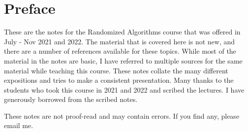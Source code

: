 \chapter*{Preface}

These are the notes for the Randomized Algorithms course that was offered in
July - Nov 2021 and 2022. The material that is covered here is not new, and
there are a number of references available for these topics. While most of the
material in the notes are basic, I have referred to multiple sources for the
same material while teaching this course. These notes collate the many different
expositions and tries to make a consistent presentation. Many thanks to the
students who took this course in 2021 and 2022 and scribed the
lectures. I have generously borrowed from the scribed notes.

These notes are not proof-read and may contain errors. If you find any, please
email me.

